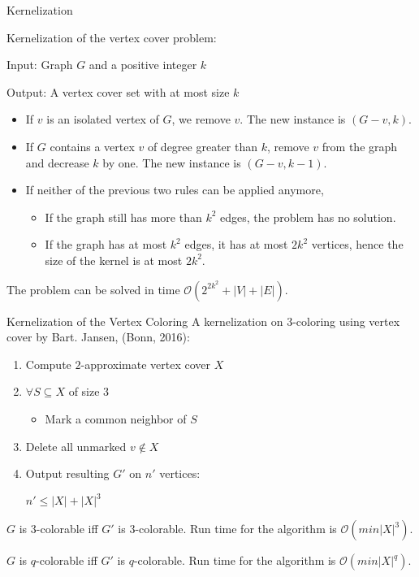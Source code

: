 \documentclass{beamer}
\begin{document}
\begin{frame}{Kernelization}
\begin{example}
Kernelization of the vertex cover problem:

Input: Graph $G$ and a positive integer $k$ 

Output: A vertex cover set with at most size $k$
\pause

\begin{itemize}
\item If $v$ is an isolated vertex of $G$, we remove $v$. The new instance is $(G - v , k)$.

\pause
\item If $G$ contains a vertex $v$ of degree greater than $k$, remove $v$ from the graph and decrease $k$ by one. The new instance is $(G - v , k - 1)$.
\pause
\item If neither of the previous two rules can be applied anymore,
\pause
\begin{itemize}
\item If the graph still has more than $k^2$ edges, the problem has no solution.
\pause
\item If the graph has at most $k^2$ edges, it has at most $2 k^2$ vertices, hence the size of the kernel is at most $2 k^2$.
\end{itemize}

  
\end{itemize}


\pause
The problem can be solved in time $\mathcal{O}(2^{2k^2} + |V| + |E|)$.
\end{example}
\end{frame}


\begin{frame}{Kernelization of the Vertex Coloring}
A kernelization on $3$-coloring using vertex cover by Bart. Jansen, (Bonn, 2016):
\pause
\begin{enumerate}
\item Compute $2$-approximate vertex cover $X$
\pause
\item $\forall S\subseteq X$ of size $3$
\pause
\begin{itemize}
\item Mark a common neighbor of $S$
\end{itemize}
\pause
\item Delete all unmarked $v \not\in X$
\pause
\item Output resulting $G'$ on $n'$ vertices:

\begin{center}
\pause
$n' \leq |X| + |X|^3$
\end{center}
\end{enumerate}
\pause
$G$ is $3$-colorable iff $G'$ is $3$-colorable. Run time for the algorithm is $\mathcal{O}(min|X|^3)$.

\pause
\begin{theorem}{\label{main theorem}}
$G$ is $q$-colorable iff $G'$ is $q$-colorable. Run time for the algorithm
is $\mathcal{O}(min|X|^q)$.
\end{theorem}
\end{frame}
\end{document}
